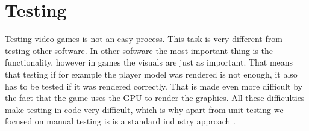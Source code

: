 \chapter{Testing} \label{ch:testing}
Testing video games is not an easy process.
This task is very different from testing other software.
In other software the most important thing is the functionality, however in games the visuals are just as important.
That means that testing if for example the player model was rendered is not enough, it also has to be tested if it was rendered correctly.
That is made even more difficult by the fact that the game uses the GPU to render the graphics.
All these difficulties make testing in code very difficult, which is why apart from unit testing we focused on manual testing is is a standard industry approach \cite{DBLP:journals/corr/abs-2103-06431}.


